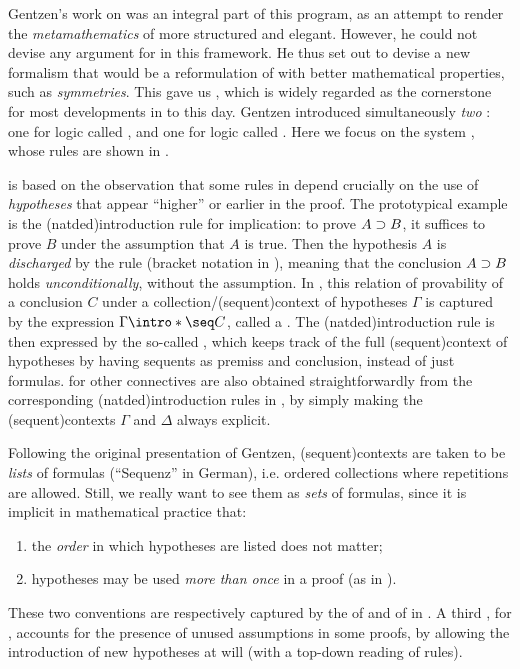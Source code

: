 \AP
Gentzen's work on  was an integral part of this program,
as an attempt to render the \emph{metamathematics} of  more
structured and elegant. However, he could not devise any argument for
 in this framework. He thus set out to devise a new formalism
that would be a reformulation of  with better mathematical
properties, such as \emph{symmetries}. This gave us ,
which is widely regarded as the cornerstone for most developments in  to this day. Gentzen introduced simultaneously \emph{two} : one for  logic called , and one for
 logic called . Here we focus on the
 system , whose rules are shown in
.

\AP
{} is based on the observation that some rules in  depend crucially on the use of \emph{hypotheses} that appear
``higher'' or earlier in the proof. The prototypical example is the
\kl(natded){introduction rule}  for implication: to prove $A \supset
B$, it suffices to prove $B$ under the assumption that $A$ is true. Then the
hypothesis $A$ is \emph{discharged} by the rule (bracket notation in
), meaning that the conclusion $A \supset B$ holds
\emph{unconditionally}, without the assumption. In , this
relation of provability of a conclusion $C$ under a
collection/\intro(sequent){context} of hypotheses $\Gamma$ is captured by the
expression $\Gamma \intro*\seq C$, called a . The
\kl(natded){introduction rule}  is then expressed by the so-called
 , which keeps track of the full
\kl(sequent){context} of hypotheses by having sequents as premiss and
conclusion, instead of just formulas.  for other
connectives are also obtained straightforwardly from the corresponding
\kl(natded){introduction rules} in , by simply making the
\kl(sequent){contexts} $\Gamma$ and $\Delta$ always explicit.

\AP
Following the original presentation of Gentzen, \kl(sequent){contexts} are taken
to be \emph{lists} of formulas (``Sequenz'' in German), i.e. ordered collections
where repetitions are allowed. Still, we really want to see them as \emph{sets}
of formulas, since it is implicit in mathematical practice that:
\begin{enumerate}
\item the \emph{order} in which hypotheses are listed does not matter;
\item hypotheses may be used \emph{more than once} in a proof (as in
).
\end{enumerate}
These two conventions are respectively captured by the 
 of  and  of  in
. A third ,  for
, accounts for the presence of unused assumptions in some
proofs, by allowing the introduction of new hypotheses at will (with a top-down
reading of rules).

